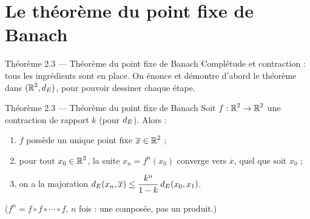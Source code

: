 \section{Le théorème du point fixe de Banach}

\begin{frame}{Théorème 2.3 --- Théorème du point fixe de Banach}
  \small Complétude et contraction : tous les ingrédients sont en place.
  On énonce et démontre d'abord le théorème dans $(\operatorname{\mathbb{R}}^2,d_E)$, pour
  pouvoir dessiner chaque étape.
  \begin{Enonce}{Théorème 2.3 --- Théorème du point fixe de Banach}
    Soit $f:\operatorname{\mathbb{R}}^2\to\operatorname{\mathbb{R}}^2$ une contraction de rapport $k$ (pour $d_E$).
    Alors :
    \begin{enumerate}
      \item[(i)] $f$ possède un unique point fixe
        $\overline{x}\in\operatorname{\mathbb{R}}^2$ ;
      \item[(ii)] pour tout $x_0\in\operatorname{\mathbb{R}}^2$, la suite $x_n = f^n(x_0)$
        converge vers $\overline{x}$, quel que soit $x_0$ ;
      \item[(iii)] on a la majoration
        $\displaystyle d_E(x_n,\overline{x})\leq\frac{k^n}{1-k}\,d_E(x_0,x_1)$.
    \end{enumerate}
  \end{Enonce}
  \scriptsize ($f^n = f\circ f\circ\cdots\circ f$, $n$ fois : une
  composée, pas un produit.)
\end{frame}

